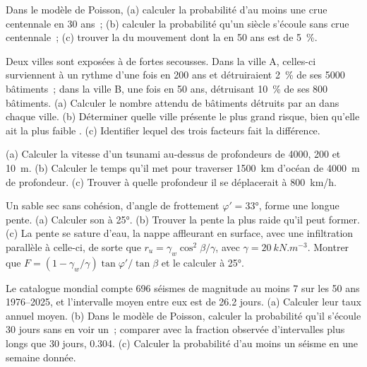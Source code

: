 \begin{exercise}[$\star$]\label{exo:b2:geological-hazards:1}
Dans le modèle de Poisson, (a) calculer la probabilité d'au moins une crue centennale en 30 ans~;
(b) calculer la probabilité qu'un siècle s'écoule sans crue centennale~; (c) trouver la  du mouvement dont la  en 50 ans est de \qty{5}{\percent}.
\end{exercise}

\begin{exercise}[$\star$]\label{exo:b2:geological-hazards:2}
Deux villes sont exposées à de fortes secousses. Dans la ville A, celles-ci surviennent à un rythme
d'une fois en 200 ans et détruiraient \qty{2}{\percent} de ses 5000 bâtiments~; dans la ville B, une
fois en 50 ans, détruisant \qty{10}{\percent} de ses 800 bâtiments. (a) Calculer le nombre attendu de
bâtiments détruits par an dans chaque ville. (b) Déterminer quelle ville présente le plus grand risque,
bien qu'elle ait la plus faible . (c) Identifier lequel des trois facteurs fait la différence.
\end{exercise}

\begin{exercise}[$\star$]\label{exo:b2:geological-hazards:3}
(a) Calculer la vitesse d'un tsunami au-dessus de profondeurs de 4000, 200 et \qty{10}{m}.
(b) Calculer le temps qu'il met pour traverser \qty{1500}{km} d'océan de \qty{4000}{m}
de profondeur. (c) Trouver à quelle profondeur il se déplacerait à \qty{800}{km/h}.
\end{exercise}

\begin{exercise}[$\star$]\label{exo:b2:geological-hazards:4}
Un sable sec sans cohésion, d'angle de frottement $\varphi' = \ang{33}$, forme une longue pente.
(a) Calculer son  à \ang{25}. (b) Trouver la pente la plus raide qu'il peut
former. (c) La pente se sature d'eau, la nappe affleurant en surface, avec une infiltration parallèle
à celle-ci, de sorte que $r_u = \gamma_w\cos^2\beta/\gamma$, avec $\gamma = \qty{20}{kN.m^{-3}}$.
Montrer que $F = (1 - \gamma_w/\gamma)\tan\varphi'/\tan\beta$ et le calculer à \ang{25}.
\end{exercise}

\begin{exercise}[$\star\star$]\label{exo:b2:geological-hazards:5}
Le catalogue mondial compte 696 séismes de magnitude au moins 7 sur les 50 ans 1976--2025,
et l'intervalle moyen entre eux est de 26.2 jours. (a) Calculer leur taux annuel
moyen. (b) Dans le modèle de Poisson, calculer la probabilité qu'il s'écoule 30 jours
sans en voir un~; comparer avec la fraction observée d'intervalles plus longs que 30
jours, 0.304. (c) Calculer la probabilité d'au moins un séisme en une semaine donnée.
\end{exercise}

